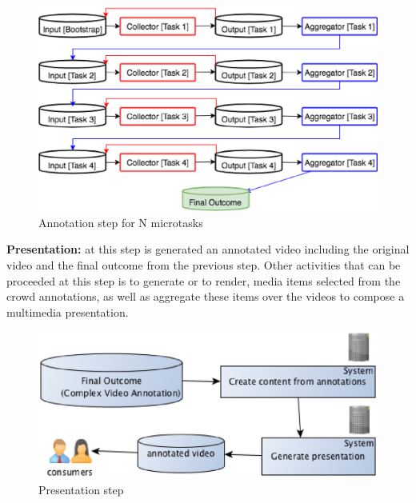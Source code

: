 \begin{figure}[h]
	\centerline{\includegraphics[scale=0.25] {figure/cascading}}
	\caption{Annotation step for N microtasks}
	\label{cascading}
\end{figure}

\textbf{Presentation:} at this step is generated an annotated video including the original video and the final outcome from the previous step. Other activities that can be proceeded at this step is to generate or to render, media items selected from the crowd annotations, as well as aggregate these items over the videos to compose a multimedia presentation.

\begin{figure}[h]
	\centerline{\includegraphics[scale=0.5] {figure/presentation}}
	\caption{Presentation step}
	\label{presentation}
\end{figure}








